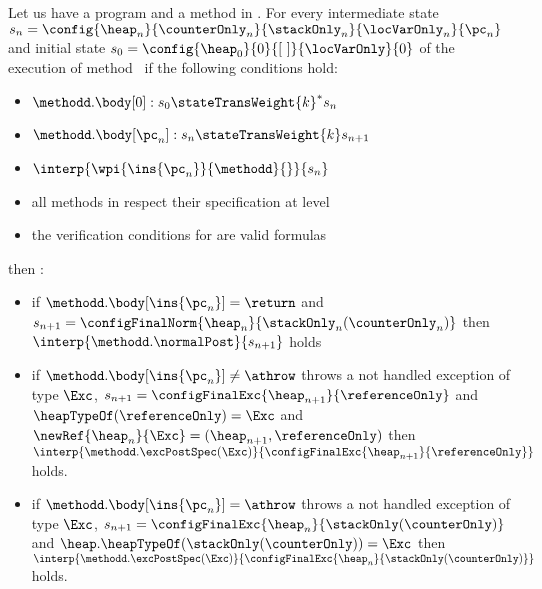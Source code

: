 \begin{lemma} \label{lemma0}
Let us have a program \Program{} and a method \methodd{} in \Program.
For every intermediate state $s_n =\config{\heap_n }{\counterOnly_n }{\stackOnly_n }{\locVarOnly_n }{\pc_n } $ and
 initial state $s_{0} =\config{\heap_{0}  }{ 0 }{\lbrack \ \rbrack }{\locVarOnly }{ 0 } $ 
   of the execution of method \methodd \  if the following conditions hold: 
 \begin{itemize}
         \item $ \methodd.\body[0] : s_{0} \stateTransWeight{k}^{*} s_n$
         \item $ \methodd.\body[\pc_n] : s_n \stateTransWeight{k} s_{n+1}$
         \item $ \interp{\wpi{\ins{\pc_n}}{\methodd}{}}{s_n} $
	 \item all methods in \Program{} respect their specification at level   
	 \item the verification conditions for \Program{} are valid formulas
 \end{itemize}
  
  then : 
 \begin{itemize}
         
        \item if  $ \methodd.\body[\ins{\pc_n}] = \return $ and $s_{n+1} =\configFinalNorm{\heap_n}{\stackOnly_n( \counterOnly_n )} $  then  $ \interp{\methodd.\normalPost}{s_{n+1}}  $   holds
	
	\item if $\methodd.\body[\ins{\pc_n}] \neq \athrow  $ throws a not handled exception of type $\Exc$,
	 $ s_{n+1} = \configFinalExc{ \heap_{n+1}}{  \referenceOnly   }$ and $\heapTypeOf(\referenceOnly) = \Exc  $ and  $\newRef{\heap_n}{\Exc} = (\heap_{n+1}, \referenceOnly )$
	 then  $\interp{\methodd.\excPostSpec( \Exc)}{\configFinalExc{ \heap_{n+1}}{  \referenceOnly   } } $ holds.
	
	 \item if $\methodd.\body[\ins{\pc_n}] = \athrow $ throws a not handled exception of type $\Exc$,
	 	 $ s_{n+1} =\configFinalExc{ \heap_{n}}{  \stackOnly (\counterOnly)} $ and $\heap.\heapTypeOf(\stackOnly (\counterOnly) ) = \Exc  $ 
	 then  $\interp{\methodd.\excPostSpec( \Exc)}{\configFinalExc{ \heap_{n}}{  \stackOnly (\counterOnly)   } } $  holds.
	 

\end{itemize}
\end{lemma}
